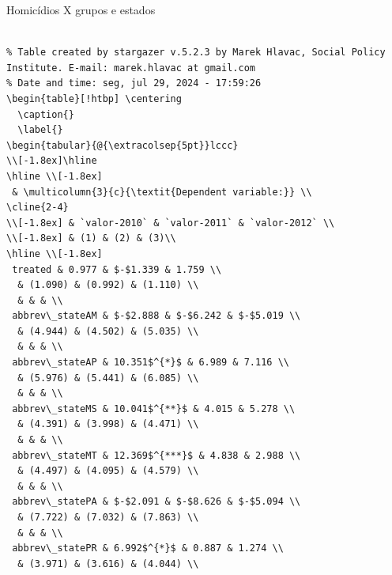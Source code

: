 \documentclass[
  ignorenonframetext,
]{beamer}
\begin{document}
\begin{frame}[fragile]{Homicídios X grupos e estados}
\label{homicuxeddios-x-grupos-e-estados}
\begin{verbatim}

% Table created by stargazer v.5.2.3 by Marek Hlavac, Social Policy Institute. E-mail: marek.hlavac at gmail.com
% Date and time: seg, jul 29, 2024 - 17:59:26
\begin{table}[!htbp] \centering 
  \caption{} 
  \label{} 
\begin{tabular}{@{\extracolsep{5pt}}lccc} 
\\[-1.8ex]\hline 
\hline \\[-1.8ex] 
 & \multicolumn{3}{c}{\textit{Dependent variable:}} \\ 
\cline{2-4} 
\\[-1.8ex] & `valor-2010` & `valor-2011` & `valor-2012` \\ 
\\[-1.8ex] & (1) & (2) & (3)\\ 
\hline \\[-1.8ex] 
 treated & 0.977 & $-$1.339 & 1.759 \\ 
  & (1.090) & (0.992) & (1.110) \\ 
  & & & \\ 
 abbrev\_stateAM & $-$2.888 & $-$6.242 & $-$5.019 \\ 
  & (4.944) & (4.502) & (5.035) \\ 
  & & & \\ 
 abbrev\_stateAP & 10.351$^{*}$ & 6.989 & 7.116 \\ 
  & (5.976) & (5.441) & (6.085) \\ 
  & & & \\ 
 abbrev\_stateMS & 10.041$^{**}$ & 4.015 & 5.278 \\ 
  & (4.391) & (3.998) & (4.471) \\ 
  & & & \\ 
 abbrev\_stateMT & 12.369$^{***}$ & 4.838 & 2.988 \\ 
  & (4.497) & (4.095) & (4.579) \\ 
  & & & \\ 
 abbrev\_statePA & $-$2.091 & $-$8.626 & $-$5.094 \\ 
  & (7.722) & (7.032) & (7.863) \\ 
  & & & \\ 
 abbrev\_statePR & 6.992$^{*}$ & 0.887 & 1.274 \\ 
  & (3.971) & (3.616) & (4.044) \\ 

\end{verbatim}
\end{frame}
\end{document}
